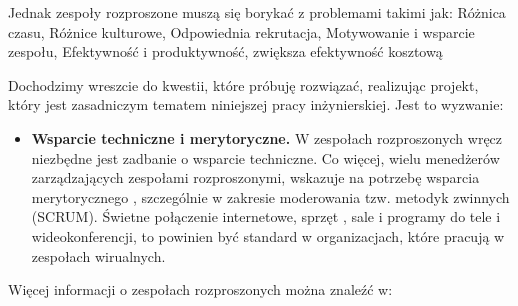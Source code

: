 Jednak zespoły rozproszone muszą się borykać z problemami takimi jak: Różnica czasu, Różnice kulturowe, Odpowiednia rekrutacja, Motywowanie i wsparcie zespołu, Efektywność i produktywność, zwiększa efektywność kosztową

Dochodzimy wreszcie do kwestii, które próbuję rozwiązać, realizując projekt, który jest zasadniczym tematem niniejszej pracy inżynierskiej. Jest to wyzwanie:

\begin{itemize}
	\item \textbf{Wsparcie techniczne i merytoryczne.}
	W zespołach rozproszonych wręcz niezbędne jest zadbanie o wsparcie techniczne. Co więcej, wielu menedżerów zarządzających zespołami rozproszonymi, wskazuje na potrzebę wsparcia merytorycznego , szczególnie w zakresie moderowania tzw. metodyk zwinnych (SCRUM). Świetne połączenie internetowe, sprzęt , sale i programy do tele i wideokonferencji, to powinien być standard w organizacjach, które pracują w zespołach wirualnych.
\end{itemize} 

Więcej informacji o zespołach rozproszonych można znaleźć w:\cite{www_rozproszony}